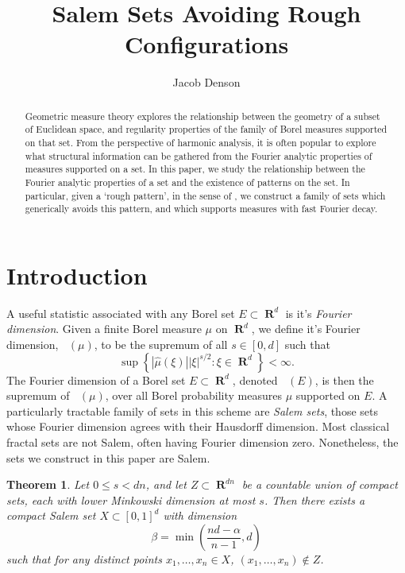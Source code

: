 \documentclass[12pt,reqno]{article}
\title{Salem Sets Avoiding Rough Configurations}
\author{Jacob Denson}
\numberwithin{equation}{section}
\DeclareMathOperator{\fordim}{\dim_{\mathbf{F}}}
\DeclareMathOperator{\RR}{\mathbf{R}}
\newtheorem{theorem}{Theorem}
\begin{document}
\maketitle

\begin{abstract}
Geometric measure theory explores the relationship between the geometry of a subset of Euclidean space, and regularity properties of the family of Borel measures supported on that set. From the perspective of harmonic analysis, it is often popular to explore what structural information can be gathered from the Fourier analytic properties of measures supported on a set. In this paper, we study the relationship between the Fourier analytic properties of a set and the existence of patterns on the set. In particular, given a `rough pattern', in the sense of \cite{OurPaper}, we construct a family of sets which generically avoids this pattern, and which supports measures with fast Fourier decay.
\end{abstract}

\section{Introduction}

A useful statistic associated with any Borel set $E \subset \RR^d$ is it's \emph{Fourier dimension}. Given a finite Borel measure $\mu$ on $\RR^d$, we define it's Fourier dimension, $\fordim(\mu)$, to be the supremum of all $s \in [0,d]$ such that
%
\begin{equation} \label{fordim}
    \sup \left\{ |\widehat{\mu}(\xi)| |\xi|^{s/2} : \xi \in \RR^d \right\} < \infty.
\end{equation}
%
The Fourier dimension of a Borel set $E \subset \RR^d$, denoted $\fordim(E)$, is then the supremum of $\fordim(\mu)$, over all Borel probability measures $\mu$ supported on $E$. A particularly tractable family of sets in this scheme are \emph{Salem sets}, those sets whose Fourier dimension agrees with their Hausdorff dimension. Most classical fractal sets are not Salem, often having Fourier dimension zero. Nonetheless, the sets we construct in this paper are Salem.

\begin{theorem} \label{maintheorem}
    Let $0 \leq s < dn$, and let $Z \subset \RR^{dn}$ be a countable union of compact sets, each with lower Minkowski dimension at most $s$. Then there exists a compact Salem set $X \subset [0,1]^d$ with dimension
    \[ \beta = \min \left( \frac{nd - \alpha}{n-1}, d \right) \]
    such that for any distinct points $x_1, \dots, x_n \in X$, $(x_1, \dots, x_n) \not \in Z$.
\end{theorem}
\end{document}
